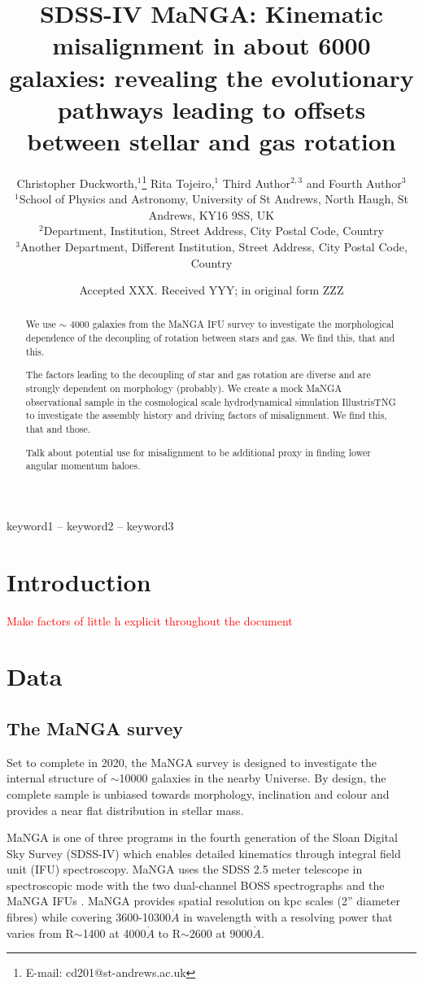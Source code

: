 \documentclass[fleqn,usenatbib]{mnras}
\title[Origin of kinematic misalignment]{SDSS-IV MaNGA: Kinematic misalignment in about 6000 galaxies: revealing the evolutionary pathways leading to offsets between stellar and gas rotation}
\author[C. Duckworth et al.]{Christopher Duckworth,$^{1}$\thanks{E-mail: cd201@st-andrews.ac.uk}
Rita Tojeiro,$^{1}$
Third Author$^{2,3}$
and Fourth Author$^{3}$
\\
{}$^{1}$School of Physics and Astronomy, University of St Andrews, North Haugh, St Andrews, KY16 9SS, UK\\
$^{2}$Department, Institution, Street Address, City Postal Code, Country\\
$^{3}$Another Department, Different Institution, Street Address, City Postal Code, Country
}
\date{Accepted XXX. Received YYY; in original form ZZZ}
\newcommand{\red}[1]{{\textcolor{red}{#1}}}
\begin{document}
\label{firstpage}
\pagerange{\pageref{firstpage}--\pageref{lastpage}}
\maketitle

\begin{abstract}
We use $\sim$ 4000 galaxies from the MaNGA IFU survey to investigate the morphological dependence of the decoupling of rotation between stars and gas. We find this, that and this.

The factors leading to the decoupling of star and gas rotation are diverse and are strongly dependent on morphology (probably). We create a mock MaNGA observational sample in the cosmological scale hydrodynamical simulation IllustrisTNG to investigate the assembly history and driving factors of misalignment. We find this, that and those.

Talk about potential use for misalignment to be additional proxy in finding lower angular momentum haloes.
\end{abstract}

\begin{keywords}
keyword1 -- keyword2 -- keyword3
\end{keywords}
\section{Introduction}
\red{Make factors of little h explicit throughout the document}
\section{Data}
\subsection{The MaNGA survey}
Set to complete in 2020, the MaNGA survey is designed to investigate the internal structure of $\sim$10000 galaxies in the nearby Universe. By design, the complete sample is unbiased towards morphology, inclination and colour and provides a near flat distribution in stellar mass. 

MaNGA is one of three programs in the fourth generation of the Sloan Digital Sky Survey (SDSS-IV) which enables detailed kinematics through integral field unit (IFU) spectroscopy. MaNGA uses the SDSS 2.5 meter telescope in spectroscopic mode \citep{gunn2006} with the two dual-channel BOSS spectrographs \citep{smee2013} and the MaNGA IFUs \citep{drory2015}. MaNGA provides spatial resolution on kpc scales (2'' diameter fibres) while covering 3600-10300$\mathring{A}$ in wavelength with a resolving power that varies from R$\sim$1400 at 4000$\mathring{A}$ to R$\sim$2600 at 9000$\mathring{A}$. 
\end{document}

